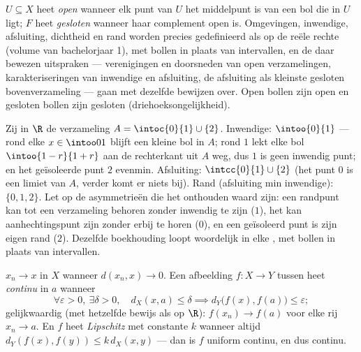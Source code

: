 \begin{definition}\label{def:b2:metric:topology}
$U \subseteq X$ heet \emph{open} wanneer elk punt van $U$ het middelpunt is van
een bol die in $U$ ligt; $F$ heet \emph{gesloten} wanneer haar
complement open is. Omgevingen, inwendige, afsluiting, dichtheid en
rand worden precies gedefinieerd als op de reële rechte (volume van
bachelorjaar 1), met bollen in plaats van intervallen, en de daar
bewezen uitspraken --- verenigingen en doorsneden van open
verzamelingen, karakteriseringen van inwendige en afsluiting, de
afsluiting als kleinste gesloten bovenverzameling --- gaan met
dezelfde bewijzen over. Open bollen zijn open en gesloten bollen
zijn gesloten (driehoeksongelijkheid).
\end{definition}

\begin{example}\label{ex:b2:metric:intclosure}
Zij in $\R$ de verzameling $A = \intoc{0}{1} \cup \{2\}$.
Inwendige: $\intoo{0}{1}$ --- rond elke $x \in \intoo01$ blijft een
kleine bol in $A$; rond $1$ lekt elke bol $\intoo{1-r}{1+r}$ aan de
rechterkant uit $A$ weg, dus $1$ is geen inwendig punt; en het
geïsoleerde punt $2$ evenmin. Afsluiting: $\intcc{0}{1} \cup \{2\}$
(het punt $0$ is een limiet van $A$, verder komt er niets bij).
Rand (afsluiting min inwendige): $\{0, 1, 2\}$. Let op de
asymmetrieën die het onthouden waard zijn: een randpunt kan tot een
verzameling behoren zonder inwendig te zijn ($1$), het kan
aanhechtingspunt zijn zonder erbij te horen ($0$), en een
geïsoleerd punt is zijn eigen rand ($2$). Dezelfde boekhouding
loopt woordelijk in elke , met bollen in plaats van
intervallen.
\end{example}

\begin{definition}\label{def:b2:metric:continuity}
$x_n \to x$ in $X$ wanneer $d(x_n, x) \to 0$. Een afbeelding $f
\colon X \to Y$ tussen  heet
\emph{continu} in $a$ wanneer
\[
\forall \varepsilon > 0,\ \exists\delta > 0,\quad
d_X(x, a) \leq \delta \implies d_Y\bigl(f(x), f(a)\bigr) \leq
\varepsilon ;
\]
gelijkwaardig (met hetzelfde bewijs als op $\R$): $f(x_n) \to f(a)$
voor elke rij $x_n \to a$. En $f$ heet
\emph{Lipschitz} met constante $k$ wanneer altijd
$d_Y(f(x), f(y)) \leq k\, d_X(x, y)$ --- dan is $f$ uniform
continu, en dus continu.
\end{definition}

